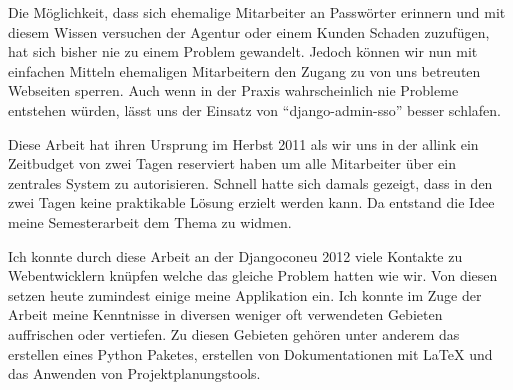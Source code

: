 Die Möglichkeit, dass sich ehemalige Mitarbeiter an Passwörter erinnern und mit diesem Wissen versuchen der Agentur oder einem Kunden Schaden zuzufügen, hat sich bisher nie zu einem Problem gewandelt. Jedoch können wir nun mit einfachen Mitteln ehemaligen Mitarbeitern den Zugang zu  von uns betreuten Webseiten sperren. Auch wenn in der Praxis wahrscheinlich nie Probleme entstehen würden, lässt uns der Einsatz von ``django-admin-sso'' besser schlafen.

Diese Arbeit hat ihren Ursprung im Herbst 2011 als wir uns in der allink ein Zeitbudget von zwei Tagen reserviert haben um alle Mitarbeiter über ein zentrales System zu autorisieren. Schnell hatte sich damals gezeigt, dass in den zwei Tagen keine praktikable Lösung erzielt werden kann. Da entstand die Idee meine Semesterarbeit dem Thema zu widmen.

Ich konnte durch diese Arbeit an der Djangoconeu 2012 viele Kontakte zu Webentwicklern knüpfen welche das gleiche Problem hatten wie wir. Von diesen setzen heute zumindest einige meine Applikation ein. Ich konnte im Zuge der Arbeit meine Kenntnisse in diversen weniger oft verwendeten Gebieten auffrischen oder vertiefen. Zu diesen Gebieten gehören unter anderem das erstellen eines Python Paketes, erstellen von Dokumentationen mit LaTeX und das Anwenden von Projektplanungstools.